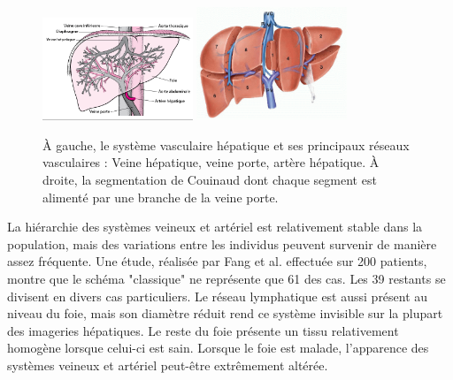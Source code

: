 \begin{figure}[!ht]
    \centering
    \includegraphics[width=0.4\textwidth]{Images/Liver_vasculature.png}
    \includegraphics[width=0.4\textwidth]{Images/Couinaud.png}
    \caption{À gauche, le système vasculaire hépatique et ses principaux réseaux vasculaires : Veine hépatique, veine porte, artère hépatique. À droite, la segmentation de Couinaud dont chaque segment est alimenté par une branche de la veine porte.\protect \footnotemark} 
    \label{fig:liver veins}
  \end{figure}
  


La hiérarchie des systèmes veineux et artériel est relativement stable dans la population, mais des variations entre les individus peuvent survenir de manière assez fréquente. Une étude, réalisée par Fang et al. \cite{Fang2012_Liver_vein_variations} effectuée sur 200 patients, montre que le schéma "classique" ne représente que 61 \percent{}des cas. Les 39 \percent{}restants se divisent en divers cas particuliers. Le réseau lymphatique est aussi présent au niveau du foie, mais son diamètre réduit rend ce système invisible sur la plupart des imageries hépatiques. Le reste du foie présente un tissu relativement homogène lorsque celui-ci est sain.
Lorsque le foie est malade, l'apparence des systèmes veineux et artériel peut-être extrêmement altérée. 


